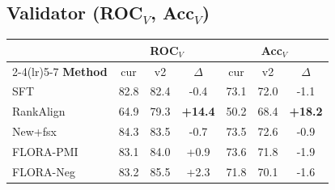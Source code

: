 \documentclass[10pt]{article}
\begin{document}
\subsection*{Validator (ROC$_V$, Acc$_V$)}
\begin{center}\footnotesize\setlength{\tabcolsep}{4pt}
\begin{tabular}{l ccc ccc}
\toprule
& \multicolumn{3}{c}{\textbf{ROC}$_V$} & \multicolumn{3}{c}{\textbf{Acc}$_V$} \\
\cmidrule(lr){2-4}\cmidrule(lr){5-7}
\textbf{Method} & cur & v2 & $\Delta$ & cur & v2 & $\Delta$ \\
\midrule
SFT & 82.8 & 82.4 & -0.4 & 73.1 & 72.0 & -1.1 \\
RankAlign & 64.9 & 79.3 & \textbf{+14.4} & 50.2 & 68.4 & \textbf{+18.2} \\
New+fsx & 84.3 & 83.5 & -0.7 & 73.5 & 72.6 & -0.9 \\
FLORA-PMI & 83.1 & 84.0 & +0.9 & 73.6 & 71.8 & -1.9 \\
FLORA-Neg & 83.2 & 85.5 & +2.3 & 71.8 & 70.1 & -1.6 \\
\bottomrule
\end{tabular}
\end{center}
\end{document}
